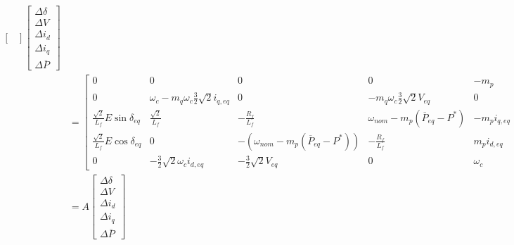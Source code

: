 \begin{align*}
\begin{bmatrix}
	\end{bmatrix}\begin{bmatrix}
	\Delta\delta\\\Delta V\\\Delta i_d\\\Delta i_q\\\Delta \overline{P}
	\end{bmatrix}\\
	&= \begin{bmatrix}
			0 & 0 & 0 & 0 & -m_p\\
			0 & \omega_c-m_q\omega_c\frac{3}{2}\sqrt{2}i_{q,eq} & 0 & -m_q\omega_c\frac{3}{2}\sqrt{2}V_{eq} & 0\\
			\frac{\sqrt{2}}{L_f}E\sin \delta_{eq} & \frac{\sqrt{2}}{L_f} & -\frac{R_f}{L_f} & \omega_{nom}-m_p(\overline{P}_{eq}-P^*) & -m_pi_{q,eq}\\
			\frac{\sqrt{2}}{L_f}E\cos\delta_{eq} & 0 & -\left(\omega_{nom}-m_p(\overline{P}_{eq}-P^*)\right) & -\frac{R_f}{L_f} & m_pi_{d,eq}\\
			0 & -\frac{3}{2}\sqrt{2}\omega_c i_{d,eq} & -\frac{3}{2}\sqrt{2}V_{eq} & 0 & \omega_c
		\end{bmatrix}\begin{bmatrix}
	\Delta\delta\\\Delta V\\\Delta i_d\\\Delta i_q\\\Delta \overline{P}
\end{bmatrix}\\
&= A\begin{bmatrix}
\Delta\delta\\\Delta V\\\Delta i_d\\\Delta i_q\\\Delta \overline{P}
\end{bmatrix}
\end{align*}